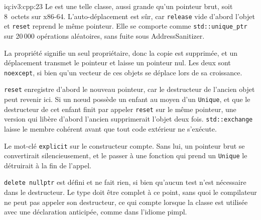 \begin{solution}{iq:iv3:cpp:23}
Le  est une telle classe, aussi grande qu'un pointeur brut, soit 8~octets sur x86-64. L'auto-déplacement est sûr, car \texttt{release} vide d'abord l'objet et \texttt{reset} reprend le même pointeur. Elle se comporte comme \texttt{std::unique\_ptr} sur 20\,000 opérations aléatoires, sans fuite sous AddressSanitizer.
\label{lst:iv3:cp:unique}

La propriété signifie un seul propriétaire, donc la copie est supprimée, et un déplacement transmet le pointeur et laisse un pointeur nul. Les deux sont \texttt{noexcept}, si bien qu'un vecteur de ces objets se déplace lors de sa croissance.

\texttt{reset} enregistre d'abord le nouveau pointeur, car le destructeur de l'ancien objet peut revenir ici. Si un nœud possède un enfant au moyen d'un \texttt{Unique}, et que le destructeur de cet enfant finit par appeler \texttt{reset} sur le même pointeur, une version qui libère d'abord l'ancien supprimerait l'objet deux fois. \texttt{std::exchange} laisse le membre cohérent avant que tout code extérieur ne s'exécute.

Le mot-clé \texttt{explicit} sur le constructeur compte. Sans lui, un pointeur brut se convertirait silencieusement, et le passer à une fonction qui prend un \texttt{Unique} le détruirait à la fin de l'appel.

\texttt{delete nullptr} est défini et ne fait rien, si bien qu'aucun test n'est nécessaire dans le destructeur. Le type doit être complet à ce point, sans quoi le compilateur ne peut pas appeler son destructeur, ce qui compte lorsque la classe est utilisée avec une déclaration anticipée, comme dans l'idiome pimpl.

\end{solution}

